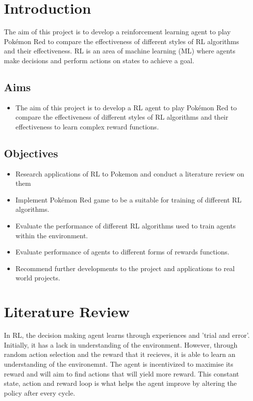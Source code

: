 \documentclass{surrey_disso_style}
\begin{document}
\newpage
\section{Introduction}
The aim of this project is to develop a reinforcement learning agent to play Pokémon Red to compare the effectiveness of different styles of RL algorithms and their effectiveness. RL is an area of machine learning (ML) where agents make decisions and perform actions on states to achieve a goal. 

\subsection{Aims}

\begin{itemize}
   \item [\ding{54}] The aim of this project is to develop a RL agent to play Pokémon Red to compare the effectiveness of different styles of RL algorithms and their effectiveness to learn complex reward functions.
\end{itemize}

\subsection{Objectives}

\begin{itemize}
   \item [\ding{169}] Research applications of RL to Pokemon and conduct a literature review on them
   \item [\ding{169}] Implement Pokémon Red game to be a suitable for training of different RL algorithms.
   \item [\ding{169}] Evaluate the performance of different RL algorithms used to train agents within the environment.
   \item [\ding{169}] Evaluate performance of agents to different forms of rewards functions.
   \item [\ding{169}] Recommend further developments to the project and applications to real world projects.
\end{itemize}

\section{Literature Review}
In RL, the decision making agent learns through experiences and 'trial and error'. Initially, it has a lack in understanding of the 
environment. However, through random action selection and the reward that it recieves, it is able to learn an understanding of the 
environemnt. The agent is incentivized to maximise its reward and will aim to find actions that will yield more reward. This constant
 state, action and reward loop is what helps the agent improve by altering the policy after every cycle. 
\par
\end{document}
